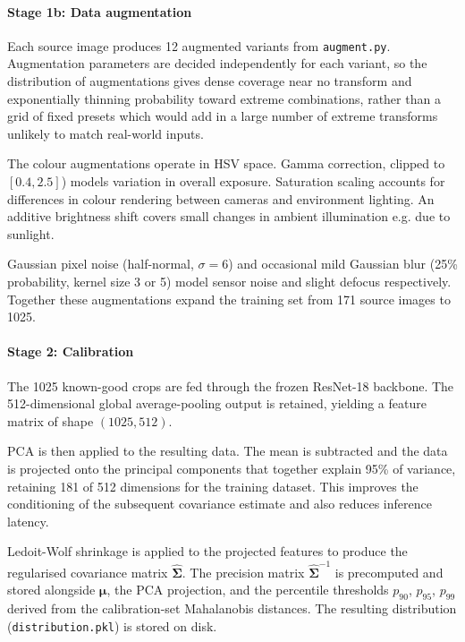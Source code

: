 \documentclass[conference]{IEEEtran}
\begin{document}
\paragraph{Stage 1b: Data augmentation}
Each source image produces 12 augmented variants from \texttt{augment.py}. Augmentation parameters are decided independently for each variant, so the distribution of augmentations gives dense coverage near no transform and exponentially thinning probability toward extreme combinations, rather than a grid of fixed presets which would add in a large number of extreme transforms unlikely to match real-world inputs.

The colour augmentations operate in HSV space. Gamma correction, clipped to $[0.4, 2.5]$) models variation in overall exposure. Saturation scaling accounts for differences in colour rendering between cameras and environment lighting. An additive brightness shift covers small changes in ambient illumination e.g. due to sunlight.

Gaussian pixel noise (half-normal, $\sigma=6$) and occasional mild Gaussian blur (25\% probability, kernel size 3 or 5) model sensor noise and slight defocus respectively. Together these augmentations expand the training set from 171 source images to 1025.

\paragraph{Stage 2: Calibration}
The 1025 known-good crops are fed through the frozen ResNet-18 backbone. The 512-dimensional global average-pooling output is retained, yielding a feature matrix of shape $(1025, 512)$.

PCA is then applied to the resulting data. The mean is subtracted and the data is projected onto the principal components that together explain 95\% of variance, retaining 181 of 512 dimensions for the training dataset. This improves the conditioning of the subsequent covariance estimate and also reduces inference latency.

Ledoit-Wolf shrinkage is applied to the projected features to produce the regularised covariance matrix $\hat{\boldsymbol{\Sigma}}$. The precision matrix $\hat{\boldsymbol{\Sigma}}^{-1}$ is precomputed and stored alongside $\boldsymbol{\mu}$, the PCA projection, and the percentile thresholds $p_{90}$, $p_{95}$, $p_{99}$ derived from the calibration-set Mahalanobis distances. The resulting distribution (\texttt{distribution.pkl}) is stored on disk.
\end{document}
